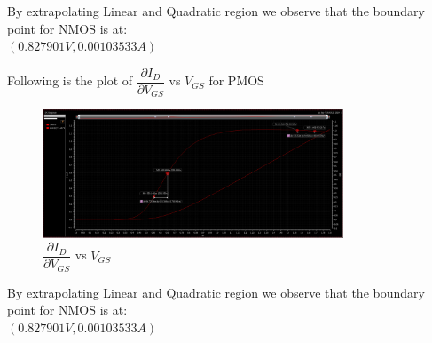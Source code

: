 \documentclass[journal, onecolumn]{IEEEtran} %
\newcommand\crule[3][black]{\textcolor{#1}{\rule{#2}{#3}}}
\begin{document}
\begin{enumerate}[2.]
{		By extrapolating Linear and Quadratic region we observe that the boundary point for NMOS is at:\\
		$(0.827901V, 0.00103533A)$


		Following is the plot of $\dfrac{\partial{I_{D}}}{\partial{V_{GS}}}$ vs $V_{GS}$ for PMOS
		\begin{figure}[htpb]
			\centering
			\includegraphics[width=0.8\textwidth]{2-3nmos}
			\caption{$\dfrac{\partial{I_{D}}}{\partial{V_{GS}}}$ vs $V_{GS}$}
			\label{fig:2-3pmos}
		\end{figure}

		By extrapolating Linear and Quadratic region we observe that the boundary point for NMOS is at:\\
		$(0.827901V, 0.00103533A)$
	}

\end{enumerate}

\pagebreak




\pagebreak
\end{document}
